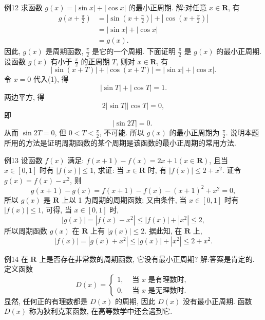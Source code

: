 例12 求函数 $g(x)=|\sin x|+|\cos x|$ 的最小正周期.
解:对任意 $x \in \mathbf{R}$, 有
$$
\begin{aligned}
g\left(x+\frac{\pi}{2}\right) & =\left|\sin \left(x+\frac{\pi}{2}\right)\right|+\left|\cos \left(x+\frac{\pi}{2}\right)\right| \\
& =|\sin x|+|\cos x| \\
& =g(x) .
\end{aligned}
$$
因此, $g(x)$ 是周期函数, $\frac{\pi}{2}$ 是它的一个周期.
下面证明 $\frac{\pi}{2}$ 是 $g(x)$ 的最小正周期.
设函数 $g(x)$ 有小于 $\frac{\pi}{2}$ 的正周期 $T$, 则对 $x \in \mathbf{R}$, 有
$$
|\sin (x+T)|+|\cos (x+T)|=|\sin x|+|\cos x| .
$$
令 $x=0$ 代入(1), 得
$$
|\sin T|+|\cos T|=1 .
$$
两边平方, 得
$$
2|\sin T||\cos T|=0,
$$
即
$$
|\sin 2 T|=0 \text {. }
$$
从而 $\sin 2 T=0$, 但 $0<T<\frac{\pi}{2}$, 不可能.
所以 $g(x)$ 的最小正周期为 $\frac{\pi}{2}$.
说明本题所用的方法是证明周期函数的某个周期是该函数的最小正周期的常用方法.



例13 设函数 $f(x)$ 满足: $f(x+1)-f(x)=2 x+1(x \in \mathbf{R})$, 且当 $x \in [0,1]$ 时有 $|f(x)| \leqslant 1$, 求证: 当 $x \in \mathbf{R}$ 时, 有 $|f(x)| \leqslant 2+x^2$.
证令 $g(x)=f(x)-x^2$, 则
$$
g(x+1)-g(x)=f(x+1)-f(x)-(x+1)^2+x^2=0,
$$
所以 $g(x)$ 是 $\mathbf{R}$ 上以 1 为周期的周期函数; 又由条件, 当 $x \in[0,1]$ 时有 $|f(x)| \leqslant 1$, 可得, 当 $x \in[0,1]$ 时,
$$
|g(x)|=\left|f(x)-x^2\right| \leqslant|f(x)|+\left|x^2\right| \leqslant 2,
$$
所以周期函数 $g(x)$ 在 $\mathbf{R}$ 上有 $|g(x)| \leqslant 2$. 据此知, 在 $\mathbf{R}$ 上,
$$
|f(x)|=\left|g(x)+x^2\right| \leqslant|g(x)|+\left|x^2\right| \leqslant 2+x^2 .
$$



例14 在 $\mathbf{R}$ 上是否存在非常数的周期函数, 它没有最小正周期?
解:答案是肯定的.
定义函数
$$
D(x)= \begin{cases}1, & \text { 当 } x \text { 是有理数时, } \\ 0, & \text { 当 } x \text { 是无理数时.
}\end{cases}
$$
显然, 任何正的有理数都是 $D(x)$ 的周期, 因此 $D(x)$ 没有最小正周期.
函数 $D(x)$ 称为狄利克莱函数, 在高等数学中还会遇到它.



